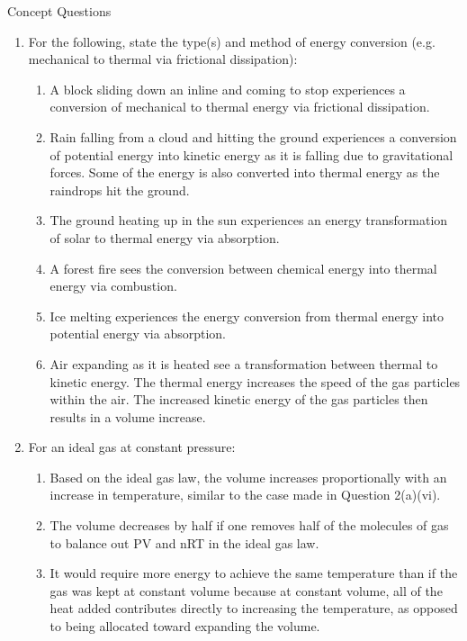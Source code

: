\documentclass{homework}
\begin{document}
\question Concept Questions
\begin{enumerate}[label=(\alph*)]
    \item For the following, state the type(s) and method of energy conversion (e.g. mechanical to thermal via frictional dissipation):
    \begin{enumerate}[label=\roman*.]
        \item A block sliding down an inline and coming to stop experiences a conversion of mechanical to thermal energy via frictional dissipation.
        \item Rain falling from a cloud and hitting the ground experiences a conversion of potential energy into kinetic energy as it is falling due to gravitational forces. Some of the energy is also converted into thermal energy as the raindrops hit the ground.
        \item The ground heating up in the sun experiences an energy transformation of solar to thermal energy via absorption.
        \item A forest fire sees the conversion between chemical energy into thermal energy via combustion.
        \item Ice melting experiences the energy conversion from thermal energy into potential energy via absorption.
        \item Air expanding as it is heated see a transformation between thermal to kinetic energy. The thermal energy increases the speed of the gas particles within the air. The increased kinetic energy of the gas particles then results in a volume increase.
    \end{enumerate}
    \item For an ideal gas at constant pressure:
    \begin{enumerate}[label=\roman*.]
        \item Based on the ideal gas law, the volume increases proportionally with an increase in temperature, similar to the case made in Question 2(a)(vi).
        \item The volume decreases by half if one removes half of the molecules of gas to balance out PV and nRT in the ideal gas law.
        \item It would require more energy to achieve the same temperature than if the gas was kept at constant volume because at constant volume, all of the heat added contributes directly to increasing the temperature, as opposed to being allocated toward expanding the volume.
    \end{enumerate}

\end{enumerate}
\end{document}
